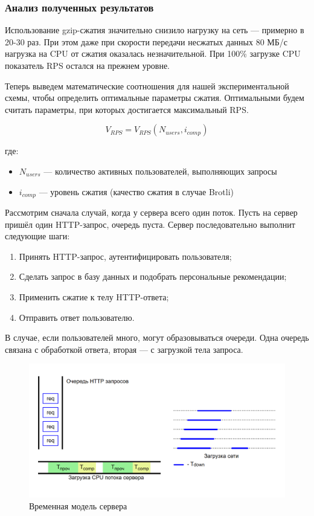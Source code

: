 \documentclass[12pt]{article}
\begin{document}
\subsubsection{Анализ полученных результатов}

Использование gzip-сжатия значительно снизило нагрузку на сеть — примерно в 20-30 раз.
При этом даже при скорости передачи несжатых данных 80 МБ/с нагрузка на CPU от сжатия оказалась незначительной.
При 100\% загрузке CPU показатель RPS остался на прежнем уровне.

Теперь выведем математические соотношения для нашей экспериментальной схемы, чтобы определить оптимальные параметры сжатия.
Оптимальными будем считать параметры, при которых достигается максимальный RPS.

\[
    V_{RPS} = V_{RPS}(N_{users}, i_{comp})
\]

где:
\begin{itemize}
    \item $N_{users}$ — количество активных пользователей, выполняющих запросы
    \item $i_{comp}$ — уровень сжатия (качество сжатия в случае Brotli)
\end{itemize}

Рассмотрим сначала случай, когда у сервера всего один поток. Пусть на сервер пришёл один HTTP-запрос, очередь пуста. Сервер последовательно выполнит следующие шаги:

\begin{enumerate}
    \item Принять HTTP-запрос, аутентифицировать пользователя;
    \item Сделать запрос в базу данных и подобрать персональные рекомендации;
    \item Применить сжатие к телу HTTP-ответа;
    \item Отправить ответ пользователю.
\end{enumerate}

В случае, если пользователей много, могут образовываться очереди. Одна очередь связана с обработкой ответа, вторая — с загрузкой тела запроса.

\begin{figure}[H]
    \centering
    \includegraphics[width=1\textwidth]{../images/timing-model.png}
    \caption{Временная модель сервера}
\end{figure}
\end{document}
